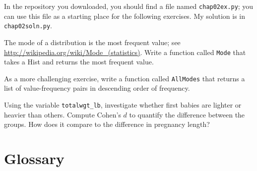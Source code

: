 \documentclass[12pt]{book}
\begin{document}
In the repository you downloaded, you should find a file named
\verb"chap02ex.py"; you can use this file as a starting place
for the following exercises.
My solution is in \verb"chap02soln.py".

\begin{exercise}
The mode of a distribution is the most frequent value; see
\url{http://wikipedia.org/wiki/Mode_(statistics)}.  Write a function
called \verb"Mode" that takes a Hist and returns the most
frequent value.

As a more challenging exercise, write a function called \verb"AllModes"
that returns a list of value-frequency pairs in descending order of
frequency.
\end{exercise}

\begin{exercise}
Using the variable \verb"totalwgt_lb", investigate whether first
babies are lighter or heavier than others.  Compute Cohen's $d$
to quantify the difference between the groups.  How does it
compare to the difference in pregnancy length?
\end{exercise}


\section{Glossary}
\end{document}
